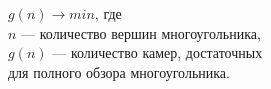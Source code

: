\documentclass[preview]{standalone}
\begin{document}
\begin{center}
$g(n) \rightarrow min$, где\\$n$ — количество вершин многоугольника,\\$g(n)$ — количество камер, достаточных\\для полного обзора многоугольника.
\end{center}
\end{document}
